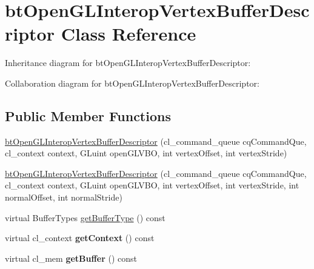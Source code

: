 \hypertarget{classbt_open_g_l_interop_vertex_buffer_descriptor}{\section{bt\+Open\+G\+L\+Interop\+Vertex\+Buffer\+Descriptor Class Reference}
\label{classbt_open_g_l_interop_vertex_buffer_descriptor}
}


Inheritance diagram for bt\+Open\+G\+L\+Interop\+Vertex\+Buffer\+Descriptor\+:


Collaboration diagram for bt\+Open\+G\+L\+Interop\+Vertex\+Buffer\+Descriptor\+:
\subsection*{Public Member Functions}
\begin{DoxyCompactItemize}
\item 
\hyperlink{classbt_open_g_l_interop_vertex_buffer_descriptor_aaa1a32a4c4589836a19b8965f8c8a828}{bt\+Open\+G\+L\+Interop\+Vertex\+Buffer\+Descriptor} (cl\+\_\+command\+\_\+queue cq\+Command\+Que, cl\+\_\+context context, G\+Luint open\+G\+L\+V\+B\+O, int vertex\+Offset, int vertex\+Stride)
\item 
\hyperlink{classbt_open_g_l_interop_vertex_buffer_descriptor_a427f8c5e77e3a8a4334c3a63d97c17ba}{bt\+Open\+G\+L\+Interop\+Vertex\+Buffer\+Descriptor} (cl\+\_\+command\+\_\+queue cq\+Command\+Que, cl\+\_\+context context, G\+Luint open\+G\+L\+V\+B\+O, int vertex\+Offset, int vertex\+Stride, int normal\+Offset, int normal\+Stride)
\item 
virtual Buffer\+Types \hyperlink{classbt_open_g_l_interop_vertex_buffer_descriptor_a7dfc26e041cacb73bd908fd6077722a2}{get\+Buffer\+Type} () const 
\item 
\hypertarget{classbt_open_g_l_interop_vertex_buffer_descriptor_afe1b48bf69522613dc2799c3cd67fa53}{virtual cl\+\_\+context {\bfseries get\+Context} () const }\label{classbt_open_g_l_interop_vertex_buffer_descriptor_afe1b48bf69522613dc2799c3cd67fa53}

\item 
\hypertarget{classbt_open_g_l_interop_vertex_buffer_descriptor_a78edd3173b2226aaf4a8371312c30466}{virtual cl\+\_\+mem {\bfseries get\+Buffer} () const }\label{classbt_open_g_l_interop_vertex_buffer_descriptor_a78edd3173b2226aaf4a8371312c30466}

\end{DoxyCompactItemize}
